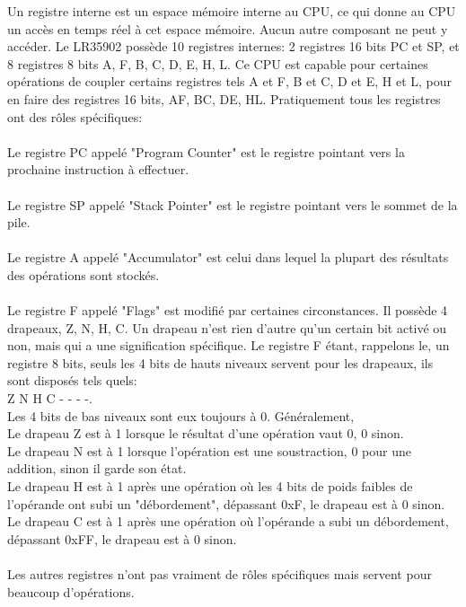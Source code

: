 \documentclass[french]{report}
\begin{document}
Un registre interne est un espace mémoire interne au CPU, ce qui donne au CPU un accès en temps réel à cet espace mémoire. Aucun autre composant ne peut y accéder.
Le LR35902 possède 10 registres internes: 2 registres 16 bits PC et SP, et 8 registres 8 bits A, F, B, C, D, E, H, L.
Ce CPU est capable pour certaines opérations de coupler certains registres tels A et F, B et C, D et E, H et L, pour en faire des registres 16 bits, AF, BC, DE, HL.
Pratiquement tous les registres ont des rôles spécifiques:\\\\
Le registre PC appelé "Program Counter" est le registre pointant vers la prochaine instruction à effectuer.\\\\
Le registre SP appelé "Stack Pointer" est le registre pointant vers le sommet de la pile.\\\\
Le registre A appelé "Accumulator" est celui dans lequel la plupart des résultats des opérations sont stockés.\\\\
Le registre F appelé "Flags" est modifié par certaines circonstances.
Il possède 4 drapeaux, Z, N, H, C. Un drapeau n'est rien d'autre qu'un certain bit activé ou non, mais qui a une signification spécifique.
Le registre F étant, rappelons le, un registre 8 bits, seuls les 4 bits de hauts niveaux servent pour les drapeaux, 
ils sont disposés tels quels: \\Z N H C - - - -.\\Les 4 bits de bas niveaux sont eux toujours à 0.
Généralement, \\Le drapeau Z est à 1 lorsque le résultat d'une opération vaut 0, 0 sinon.\\
Le drapeau N est à 1 lorsque l'opération est une soustraction, 0 pour une addition, sinon il garde son état.\\
Le drapeau H est à 1 après une opération où les 4 bits de poids faibles de l'opérande ont subi un "débordement", dépassant 0xF, le drapeau est à 0 sinon.\\
Le drapeau C est à 1 après une opération où l'opérande a subi un débordement, dépassant 0xFF, le drapeau est à 0 sinon.\\\\
Les autres registres n'ont pas vraiment de rôles spécifiques mais servent pour beaucoup d'opérations.
\end{document}
